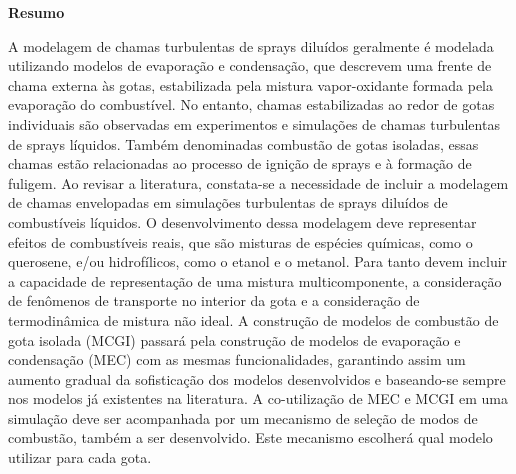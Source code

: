 
\vspace{2cm}

{ \Large \textbf{Resumo}}

\vspace{0.8cm}

{

\noindent %
A modelagem de chamas turbulentas de sprays diluídos geralmente é modelada utilizando modelos de evaporação e condensação, que descrevem uma frente de chama externa às gotas, estabilizada pela mistura vapor-oxidante formada pela evaporação do combustível.
No entanto, chamas estabilizadas ao redor de gotas individuais são observadas em experimentos e simulações de chamas turbulentas de sprays líquidos.
Também denominadas combustão de gotas isoladas, essas chamas estão relacionadas ao processo de ignição de sprays e à formação de fuligem.
Ao revisar a literatura, constata-se a necessidade de incluir a modelagem de chamas envelopadas em simulações turbulentas de sprays diluídos de combustíveis líquidos.
O desenvolvimento dessa modelagem deve representar efeitos de combustíveis reais, que são misturas de espécies químicas, como o querosene, e/ou hidrofílicos, como o etanol e o metanol.
Para tanto devem incluir a capacidade de representação de uma mistura multicomponente, a consideração de fenômenos de transporte no interior da gota e a consideração de termodinâmica de mistura não ideal.
A construção de modelos de combustão de gota isolada (MCGI) passará pela construção de modelos de evaporação e condensação (MEC) com as mesmas funcionalidades, garantindo assim um aumento gradual da sofisticação dos modelos desenvolvidos e baseando-se sempre nos modelos já existentes na literatura.
A co-utilização de MEC e MCGI em uma simulação deve ser acompanhada por um mecanismo de seleção de modos de combustão, também a ser desenvolvido.
Este mecanismo escolherá qual modelo utilizar para cada gota.

}
\vspace{1cm}

